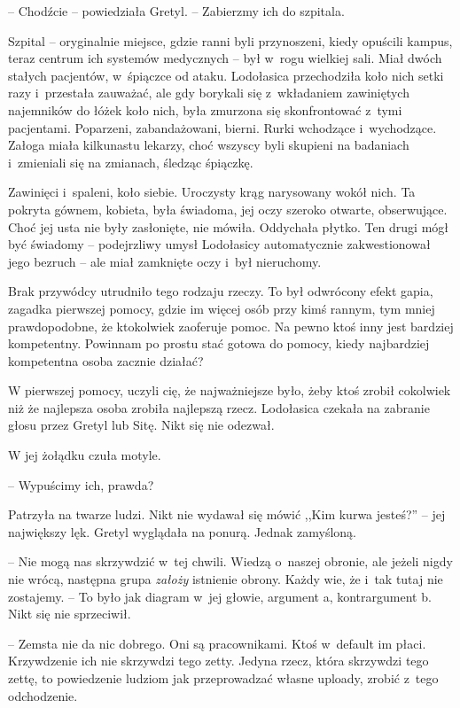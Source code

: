 \documentclass[oneside,polish,11pt,sfheadings]{mwbk}
\begin{document}
-- Chodźcie -- powiedziała Gretyl. -- Zabierzmy ich do szpitala.

Szpital -- oryginalnie miejsce, gdzie ranni byli przynoszeni, kiedy
opuścili kampus, teraz centrum ich systemów medycznych -- był w~rogu
wielkiej sali. Miał dwóch stałych pacjentów, w~śpiączce od ataku.
Lodołasica przechodziła koło nich setki razy i~przestała zauważać, ale
gdy borykali się z~wkładaniem zawiniętych najemników do łóżek koło nich,
była zmurzona się skonfrontować z~tymi pacjentami. Poparzeni,
zabandażowani, bierni. Rurki wchodzące i~wychodzące. Załoga miała
kilkunastu lekarzy, choć wszyscy byli skupieni na badaniach i~zmieniali
się na zmianach, śledząc śpiączkę.

Zawinięci i~spaleni, koło siebie. Uroczysty krąg narysowany wokół nich.
Ta pokryta gównem, kobieta, była świadoma, jej oczy szeroko otwarte,
obserwujące. Choć jej usta nie były zasłonięte, nie mówiła. Oddychała
płytko. Ten drugi mógł być świadomy -- podejrzliwy umysł Lodołasicy
automatycznie zakwestionował jego bezruch -- ale miał zamknięte oczy i~był nieruchomy.

Brak przywódcy utrudniło tego rodzaju rzeczy. To był odwrócony efekt
gapia, zagadka pierwszej pomocy, gdzie im więcej osób przy kimś rannym,
tym mniej prawdopodobne, że ktokolwiek zaoferuje pomoc. Na pewno ktoś
inny jest bardziej kompetentny. Powinnam po prostu stać gotowa do
pomocy, kiedy najbardziej kompetentna osoba zacznie działać?

W pierwszej pomocy, uczyli cię, że najważniejsze było, żeby ktoś zrobił
cokolwiek niż że najlepsza osoba zrobiła najlepszą rzecz. Lodołasica
czekała na zabranie głosu przez Gretyl lub Sitę. Nikt się nie odezwał.

W jej żołądku czuła motyle. 

-- Wypuścimy ich, prawda?

Patrzyła na twarze ludzi. Nikt nie wydawał się mówić ,,Kim kurwa
jesteś?'' -- jej największy lęk. Gretyl wyglądała na ponurą. Jednak
zamyśloną.

-- Nie mogą nas skrzywdzić w~tej chwili. Wiedzą o~naszej obronie, ale
jeżeli nigdy nie wrócą, następna grupa \textit{założy} istnienie obrony.
Każdy wie, że i~tak tutaj nie zostajemy. -- To było jak diagram w~jej
głowie, argument a, kontrargument b. Nikt się nie sprzeciwił.

-- Zemsta nie da nic dobrego. Oni są pracownikami. Ktoś w~default im
płaci. Krzywdzenie ich nie skrzywdzi tego zetty. Jedyna rzecz, która
skrzywdzi tego zettę, to powiedzenie ludziom jak przeprowadzać własne
uploady, zrobić z~tego odchodzenie.
\end{document}
